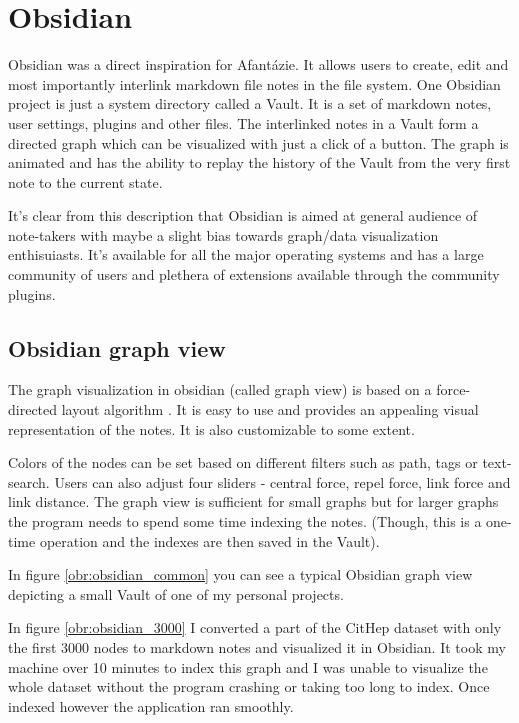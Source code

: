\section{Obsidian}

Obsidian was a direct inspiration for Afantázie. It allows users to create, edit and most importantly interlink markdown file notes in the file system.
One Obsidian project is just a system directory called a Vault. It is a set of markdown notes, user settings, plugins and other files.
The interlinked notes in a Vault form a directed graph which can be visualized with just a click of a button.
The graph is animated and has the ability to replay the history of the Vault from the very first note to the current state.

It's clear from this description that Obsidian is aimed at general audience of note-takers 
with maybe a slight bias towards graph/data visualization enthisuiasts.
It's available for all the major operating systems and has a large community of users and plethera of extensions available through the
community plugins.

\subsection*{Obsidian graph view}

The graph visualization in obsidian (called graph view) is based on a force-directed layout algorithm .
It is easy to use and provides an appealing visual representation of the notes. It is also customizable to some extent.

Colors of the nodes can be set based on different filters such as path, tags or text-search.
Users can also adjust four sliders - central force, repel force, link force and link distance.
The graph view is sufficient for small graphs but for larger graphs the program needs to spend some time indexing the notes.
(Though, this is a one-time operation and the indexes are then saved in the Vault).

In figure \ref{obr:obsidian_common} you can see a typical Obsidian graph view depicting a small Vault of one of my personal projects.

In figure \ref{obr:obsidian_3000} I converted a part of the CitHep dataset with only the first 3000 nodes to markdown notes and visualized it in Obsidian.
It took my machine over 10 minutes to index this graph and I was unable to visualize the whole dataset without the program crashing or taking too long to index.
Once indexed however the application ran smoothly.

